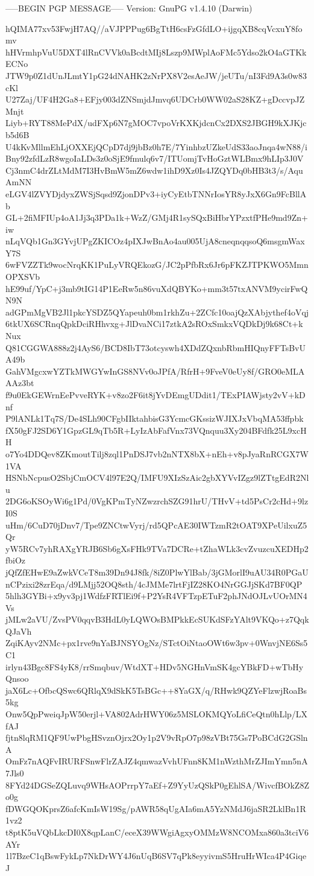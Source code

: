 -----BEGIN PGP MESSAGE-----
Version: GnuPG v1.4.10 (Darwin)

hQIMA77xv53FwjH7AQ//aVJPPPug6BgTtH6csFzGfdLO+ijgqXB8cqVcxuY8fomv
hHVrmhpVuU5DXT4lRnCVVk0aBcdtMIj8Lszp9MWplAoFMc5Ydso2kO4aGTKkECNo
JTW9p0Z1dUnJLmtY1pG24dNAHK2zNrPX8V2esAeJW/jeUTu/nI3Fd9A3s0w83cKl
U27Zaj/UF4H2Ga8+EFjy003dZNSmjdJmvq6UDCrb0WW02aS28KZ+gDccvpJZMnjt
Liyb+RYT88MePdX/udFXp6N7gMOC7vpoVrKXKjdcnCx2DXS2JBGH9kXJKjcb5d6B
U4kKvMllmEhLjOXXEjQCpD7dj9jbBz0h7E/7YinhbzUZkeUdS33aoJnqa4wN88/i
Bny92zfdLzR8wgoIaLDs3z0oSjE9fmulq6v7/ITUomjTvHoGztWLBmx9hLIp3J0V
Cj3nmC4drZLtMdM7I3HvBmW5mZ6wdw1ihD9Xz0Is4JZQYDq0bHB3t3/s/AquAmNN
eLGV4lZVYDjdyxZWSjSqsd9ZjonDPv3+iyCyEtbTNNrIosYR8yJxX6Gn9FcBllAb
GL+2fiMFIUp4oA1Jj3q3PDa1k+WzZ/GMj4R1sySQxBiHbrYPzxtfPHe9md9Zn+iw
nLqVQb1Gn3GYvjUPgZKICOz4pIXJwBnAo4au005UjA8cneqnqqsoQ6msgmWaxY7S
6wFVZZTk9wocNrqKK1PuLyVRQEkozG/JC2pPfbRx6Jr6pFKZJTPKWO5MmnOPXSVb
hE99uf/YpC+j3mb9tIG14P1EeRw5n86vuXdQBYKo+mm3t57txANVM9ycirFwQN9N
adGPmMgVB2Jl1pkcYSDZ5QYapeuh0bm1rkhZu+2ZCfc10oajQzXAbjythef4oVqj
6tkUX6SCRnqQpkDciRHhvxg+JlDvaNCi17ztkA2sROxSmkxVQDkDj9k68Ct+kNux
Q81CGGWA888z2j4AyS6/BCD8IbT73otcyswh4XDdZQxnbRbmHIQnyFFTsBvUA49b
GahVMgcxwYZTkMWGYwInGS8NVv0oJPfA/RfrH+9FveV0eUy8f/GRO0eMLAAAz3bt
f9u0EkGEWrnEePvveRYK+v8zo2F6it8jYvDEmgUDdit1/TExPIAWjsty2vV+kDnf
P9lANLk1Tq7S/De4SLh90CFgbIIktahbisG3YcmcGKssizWJIXJxVbqMA53ffpbk
fX50gFJ2SD6Y1GpzGL9qTb5R+LyIzAbFafVnx73VQnquu3Xy204BFdfk25L9xcHH
o7Yo4DDQev8ZKmoutTilj8zql1PnDSJ7vb2nNTX8bX+nEh+v8pJyaRnRCGX7W1VA
HSNbNcpusO2SbjCmOCV4l97E2Q/IMFU9XIzSzAic2gbXYVvIZgz9lZTtgEdR2Nlu
2DG6oKSOyWi6g1Pd/0VgKPmTyNZwzrchSZG91hrU/THvV+td5PsCr2cHd+9lzI0S
uHm/6CuD70jDnv7/Tpe9ZNCtwVyrj/rd5QPcAE30IWTzmR2tOAT9XPeUilxuZ5Qr
yW5RCv7yhRAXgYRJB6Sb6gXsFHk9TVa7DCRe+tZhaWLk3cvZvuzcuXEDHp2fbiOz
jQfZfEHwE9aZwkVCeT8m39Dn94J8fk/8iZ0PlwYlBab/3jGMorlI9uAU34R0PGaU
nCPzixi28zrEqa/d9LMjj52OQ8sth/4cJMMe7lrtFjIZ28KO4NrGGJjSKd7BF0QP
5hlh3GYBi+x9yv3pj1WdfzFRTlEi9f+P2YsR4VFTzpETuF2phJNdOJLvUOrMN4Vs
jMLw2aVU/ZvsPV0qqvB3HdL0yLQWOsBMPkkEcSUKdSFzYAlt9VKQo+z7QqkQJaVh
ZqiKAyv2NMc+px1rve9nYaBJNSYOgNz/STctOiNtaoOWt6w3pv+0WnvjNE6Ss5C1
irlyn43Bgc8FS4yK8/rrSmqbuv/WtdXT+HDv5NGHnVmSK4gcYBkFD+wTbHyQnsoo
jaX6Lc+OfbcQSwc6QRlqX9dSkK5TsBGc++8YaGX/q/RHwk9QZYeFlzwjRoaBs5kg
Onw5QpPweiqJpW50erjl+VA802AdrHWY06z5MSLOKMQYoLfiCeQtn0hLlp/LXfAJ
fjtn8lqRM1QF9UwPbgHSvznOjrx2Oy1p2V9vRpO7p98zVBt75Gs7PoBCdG2GSlnA
OmFz7nAQFvIRURFSnwFlrZAJZ4qmwazVvhUFnn8KM1nWzthMrZJImYmn5nA7Jls0
8FYd24DGSeZQLuvq9WHsAOPrrpY7aEf+Z9YyUzQSkP0gEhlSA/WivcfBOkZ8Zo0g
fDWGQOKprsZ6afcKmIsW19Sg/pAWR58qUgAIa6mA5YzNMdJ6jaSR2LklBn1R1vz2
t8ptK5uVQbLkcDI0X8qpLanC/eceX39WWgiAgxyOMMzW8NCOMxa860a3tciV6AYr
1l7BzeC1qBswFykLp7NkDrWY4J6nUqB6SV7qPk8eyyivmS5HruHrWIca4P4GiqeJ
